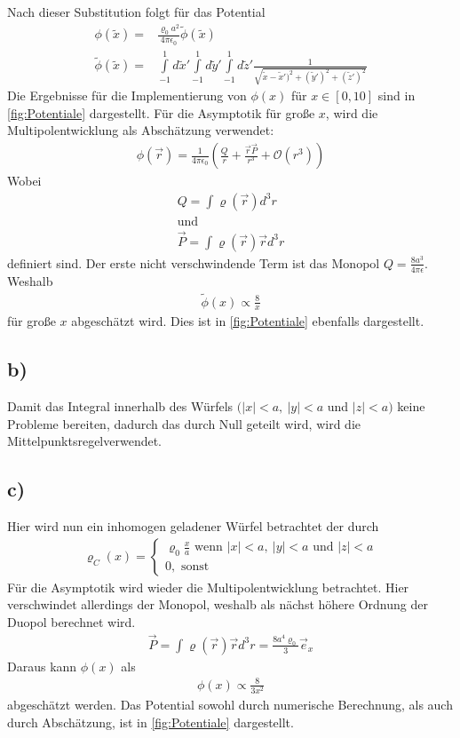 Nach dieser Substitution folgt für das Potential
\begin{align}
	\phi(\tilde{x})=&\frac{\varrho_0 a^2}{4\pi \epsilon_0} \tilde{\phi }(\tilde{ x })\\
	\tilde{\phi}(\tilde{x})=&\int\limits_{-1}^{1}d\tilde{x}'\int\limits_{-1}^{1}d\tilde{y}'\int\limits_{-1}^{1}d\tilde{z}'
	\frac{1}{ \sqrt{\tilde{x} - \tilde{x}')^2 + (\tilde{y}')^2 + (\tilde{z}')^2} }
\end{align}
Die Ergebnisse für die Implementierung von $\phi(x)$ für $x\in[0,10]$ sind in \cref{fig:Potentiale} dargestellt.
Für die Asymptotik für große $x$, wird die Multipolentwicklung als Abschätzung verwendet:
\begin{align}
	\phi (\vec{r}) = \frac{1}{4\pi\epsilon_0}\left(\frac{Q}{r} + \frac{\vec{r}\vec{P}}{r^3}+\mathcal{O}(r^3)\right)
\end{align}
Wobei
\begin{align}
	Q=\int\varrho(\vec{r})d^3r\\
	\text{und}\\
	\vec{P}=\int \varrho(\vec{r})\vec{r}d^3r
\end{align}
definiert sind.
Der erste nicht verschwindende Term ist das Monopol $Q=\frac{8a^3}{4\pi\epsilon}$. Weshalb 
\begin{align}
 \tilde{\phi}(x) \propto \frac{8}{x}
\end{align}
für große $x$ abgeschätzt wird. Dies ist in \cref{fig:Potentiale} ebenfalls dargestellt.
\subsection*{b)}
Damit das Integral innerhalb des Würfels $(|x|<a,\ |y|<a$ und $|z|<a)$ keine Probleme bereiten, dadurch das durch Null geteilt wird, wird die Mittelpunktsregelverwendet. 
\subsection*{c)}
Hier wird nun ein inhomogen geladener Würfel betrachtet der durch
\begin{align}
	\varrho_C(x)=
	\begin{cases}
		\varrho_0\frac{x}{a}\text{ wenn } |x|<a,\ |y|<a \text{ und } |z|<a\\
		0,\text{\ \ \ \ sonst}
	\end{cases}
\end{align}
Für die Asymptotik wird wieder die Multipolentwicklung betrachtet.
Hier verschwindet allerdings der Monopol, weshalb als nächst höhere Ordnung der Duopol berechnet wird.
\begin{align}
	\vec{P} = \int\varrho(\vec{r})\vec{r}d^3r=\frac{8a^4\varrho_0}{3}\vec{e}_x
\end{align}
Daraus kann $\phi(x)$ als
\begin{align}
	\phi(x)\propto \frac{8}{3x^2}
\end{align}
abgeschätzt werden.
Das Potential sowohl durch numerische Berechnung, als auch durch Abschätzung, ist in \cref{fig:Potentiale} dargestellt.